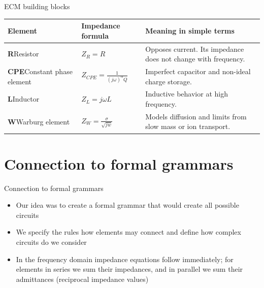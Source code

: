 \documentclass[aspectratio=169,12pt]{beamer}
\begin{document}
\begin{frame}{ECM building blocks}
  \renewcommand{\arraystretch}{1.75}
  \begin{tabularx}{\textwidth}{@{}>{\raggedright\arraybackslash}p{}>{\centering}X>{\raggedright\arraybackslash}X@{}}
    \toprule
    \textbf{Element} & \textbf{Impedance formula} & \textbf{Meaning in simple terms} \\
    \midrule
    \textbf{R}\enspace Resistor
      & $Z_R = R$ & Opposes current. Its impedance does not change with frequency. \\
    \textbf{CPE}\enspace Constant phase element
      & $Z_{CPE} = \frac{1}{(j\omega)^{\alpha}Q}$ & Imperfect capacitor and non-ideal charge storage. \\
    \textbf{L}\enspace Inductor
      & $Z_L = j\omega L$ & Inductive behavior at high frequency. \\
    \textbf{W}\enspace Warburg element
      & $Z_W = \frac{\sigma}{\sqrt{jw}}$ & Models diffusion and limits from slow mass or ion transport. \\
    \bottomrule
  \end{tabularx}
\end{frame}
\section{Connection to formal grammars}
\begin{frame}
  {Connection to formal grammars}
\begin{itemize}
  \item Our idea was to create a formal grammar that would create all possible
  circuits
  \item We specify the rules how elements may connect and define how complex 
  circuits do we consider
  \item In the frequency domain impedance equations follow immediately; for
  elements in series we sum their impedances, and in parallel we sum their
  admittances (reciprocal impedance values) 
\end{itemize}

\end{frame}
\end{document}
